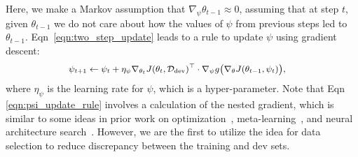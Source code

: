 Here, we make a Markov assumption that $\nabla_\psi \theta_{t-1} \approx 0$, assuming that at step $t$, given $\theta_{t-1}$ we do not care about how the values of $\psi$ from previous steps led to $\theta_{t-1}$. Eqn~\ref{eqn:two_step_update} leads to a rule to update $\psi$ using gradient descent:
\begin{equation}
  \label{eqn:psi_update_rule}
   \small
  \begin{aligned}
    \psi_{t+1} 
      &\leftarrow \psi_t + \eta_\psi \nabla_{\theta_t} J(\theta_t, \mathcal{D}_\text{dev})^\top \cdot \nabla_\psi g\big( \nabla_\theta J(\theta_{t-1}, \psi_t) \big),
  \end{aligned}
\end{equation}
where $\eta_\psi$ is the learning rate for $\psi$, which is a hyper-parameter. Note that Eqn \ref{eqn:psi_update_rule} involves a calculation of the nested gradient, which is similar to some ideas in prior work on optimization~\citep{hyper_grad}, meta-learning~\citep{finn2017model}, and neural architecture search~\citep{darts}. 
However, we are the first to utilize the idea for data selection to reduce discrepancy between the training and dev sets. 

